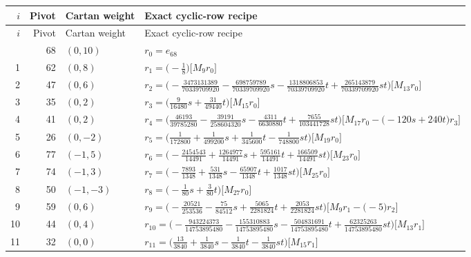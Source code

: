 \begingroup\footnotesize\setlength{\lineskip}{2pt}\setlength{\lineskiplimit}{2pt}
\setlength{\tabcolsep}{5pt}
\begin{longtable}{@{}rrlP{.64\linewidth}@{}}
\toprule
$i$ & Pivot & Cartan weight & Exact cyclic-row recipe\\
\midrule\endfirsthead
\toprule
$i$ & Pivot & Cartan weight & Exact cyclic-row recipe\\
\midrule\endhead
\bottomrule{} & 68 & $(0,10)$ & $r_{0}=e_{68}$\\
1 & 62 & $(0,8)$ & $r_{1}=\bigl(-\frac{1}{8}\bigr)\bigl[M_{9}r_{0}\bigr]$\\
2 & 47 & $(0,6)$ & $r_{2}=\bigl(-\frac{3473131389}{70339709920}-\frac{698759789}{70339709920}s-\frac{1318806853}{70339709920}t+\allowbreak \frac{265143879}{70339709920}st\bigr)\bigl[M_{13}r_{0}\bigr]$\\
3 & 35 & $(0,2)$ & $r_{3}=\bigl(\frac{9}{16480}s+\allowbreak \frac{31}{49440}t\bigr)\bigl[M_{15}r_{0}\bigr]$\\
4 & 41 & $(0,2)$ & $r_{4}=\bigl(\frac{46193}{39785280}-\frac{39191}{258604320}s-\frac{4311}{6630880}t+\allowbreak \frac{7655}{103441728}st\bigr)\bigl[M_{17}r_{0}-\allowbreak \bigl(-120s+\allowbreak 240t\bigr)r_{3}\bigr]$\\
5 & 26 & $(0,-2)$ & $r_{5}=\bigl(\frac{1}{172800}+\allowbreak \frac{1}{499200}s+\allowbreak \frac{1}{345600}t-\frac{1}{748800}st\bigr)\bigl[M_{19}r_{0}\bigr]$\\
6 & 77 & $(-1,5)$ & $r_{6}=\bigl(-\frac{2454543}{14491}+\allowbreak \frac{1264977}{14491}s+\allowbreak \frac{595161}{14491}t+\allowbreak \frac{166509}{14491}st\bigr)\bigl[M_{23}r_{0}\bigr]$\\
7 & 74 & $(-1,3)$ & $r_{7}=\bigl(-\frac{7893}{1348}+\allowbreak \frac{531}{1348}s-\frac{65907}{1348}t+\allowbreak \frac{1017}{1348}st\bigr)\bigl[M_{25}r_{0}\bigr]$\\
8 & 50 & $(-1,-3)$ & $r_{8}=\bigl(-\frac{1}{80}s+\allowbreak \frac{3}{80}t\bigr)\bigl[M_{27}r_{0}\bigr]$\\
9 & 59 & $(0,6)$ & $r_{9}=\bigl(-\frac{20521}{253536}-\frac{75}{84512}s+\allowbreak \frac{5065}{2281824}t+\allowbreak \frac{2053}{2281824}st\bigr)\bigl[M_{9}r_{1}-\allowbreak \bigl(-5\bigr)r_{2}\bigr]$\\
10 & 44 & $(0,4)$ & $r_{10}=\bigl(-\frac{943224373}{14753895480}-\frac{155310883}{14753895480}s-\frac{504831691}{14753895480}t+\allowbreak \frac{62325263}{14753895480}st\bigr)\bigl[M_{13}r_{1}\bigr]$\\
11 & 32 & $(0,0)$ & $r_{11}=\bigl(\frac{13}{3840}+\allowbreak \frac{1}{3840}s-\frac{1}{3840}t-\frac{1}{3840}st\bigr)\bigl[M_{15}r_{1}\bigr]$\\

\end{longtable}
